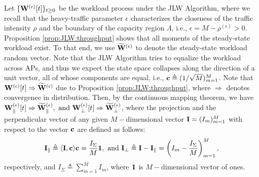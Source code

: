 \documentclass[10pt, conference, letterpaper]{IEEEtran} %
\begin{document}
Let $\{\mathbf{W}^{(\epsilon)}[t]\}_{t\geq0}$ be the workload process under the JLW Algorithm, where we recall that the heavy-traffic parameter $\epsilon$ characterizes the closeness of the traffic intensity $\rho$ and the boundary of the capacity region $\Lambda$, i.e., $\epsilon=M-\rho^{(\epsilon)}>0$. Proposition \ref{prop:JLW:throughput} shows that all moments of the steady-state workload exist. To that end, we use $\widetilde{\mathbf{W}}^{(\epsilon)}$ to denote the steady-state workload random vector. Note that the JLW Algorithm tries to equalize the workload across APs, and thus we expect the state space collapses along the direction of a unit vector, all of whose components are equal, i.e., $\mathbf{c}\triangleq(1/\sqrt{M})_{m=1}^{M}$. Note that $\mathbf{W}^{(\epsilon)}[t]\Rightarrow\widetilde{\mathbf{W}}^{(\epsilon)}$ due to Proposition \ref{prop:JLW:throughput}, where $\Rightarrow$ denotes convergence in distribution. Then, by the continuous mapping theorem, we have 
$\mathbf{W}_{\parallel}^{(\epsilon)}[t]\Rightarrow\widetilde{\mathbf{W}}_{\parallel}^{(\epsilon)}, \text{ and } \mathbf{W}_{\perp}^{(\epsilon)}[t]\Rightarrow\widetilde{\mathbf{W}}_{\perp}^{(\epsilon)}$,
where the projection and the perpendicular vector of any given $M-$dimensional vector $\mathbf{I}=(I_m)_{m=1}^{M}$ with respect to the vector $\mathbf{c}$ are defined as follows:
\begin{align*}
\mathbf{I}_{\parallel}\triangleq\langle\mathbf{I},\mathbf{c}\rangle\mathbf{c}=\frac{I_{\Sigma}}{M}\mathbf{1},  \text{ and }\mathbf{I}_{\perp}\triangleq\mathbf{I}-\mathbf{I}_{\parallel}=\left(I_m-\frac{I_{\Sigma}}{M}\right)_{m=1}^{M},
\end{align*}
respectively, and $I_{\Sigma}\triangleq\sum_{m=1}^{M}I_m$, where $\mathbf{1}$ is $M-$dimensional vector of ones.
\end{document}
